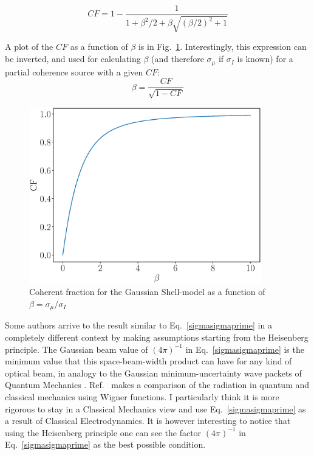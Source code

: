 \documentclass{iucr}              %
\begin{document}
\begin{equation}
CF = 1 - \frac{1}{1 + \beta^2/2 + \beta \sqrt{(\beta/2)^2+1}}
\end{equation}


A plot of the $CF$ as a function of $\beta$ is in Fig.~\ref{fig:cf_gaussianshell}. Interestingly, this expression can be inverted, and used for calculating $\beta$ (and therefore $\sigma_\mu$ if $\sigma_I$ is known) for a partial coherence source with a given $CF$: 
\begin{equation}
\beta = \frac{CF}{\sqrt{1 - CF}}
\end{equation}


\begin{figure}
  \centering
  \includegraphics[width=0.90\textwidth]{FIGURES/cf_gaussianshell.eps} 
  \caption{Coherent fraction for the Gaussian Shell-model as a function of $\beta=\sigma_{\mu}/\sigma_I$}
  \label{fig:cf_gaussianshell}
\end{figure}

Some authors \cite{alsnielsen} arrive to the result similar to Eq.~\ref{sigmasigmaprime} in a completely different context by making assumptions starting from the Heisenberg principle. The Gaussian beam value of $(4 \pi)^{-1}$ in Eq.~\ref{sigmasigmaprime} is the minimum value that this space-beam-width product can have for any kind of optical beam, in analogy to the Gaussian minimum-uncertainty wave packets of Quantum Mechanics \cite{Siegman_1990}. Ref.~\cite{bazarov} makes a comparison of the radiation in quantum and classical mechanics using Wigner functions. I particularly think it is more rigorous to stay in a Classical Mechanics view and use Eq.~\ref{sigmasigmaprime} as a result of Classical Electrodynamics. It is however interesting to notice that using the Heisenberg principle one can see the factor $(4 \pi)^{-1}$ in Eq.~\ref{sigmasigmaprime} as the best possible condition. 
\end{document}
